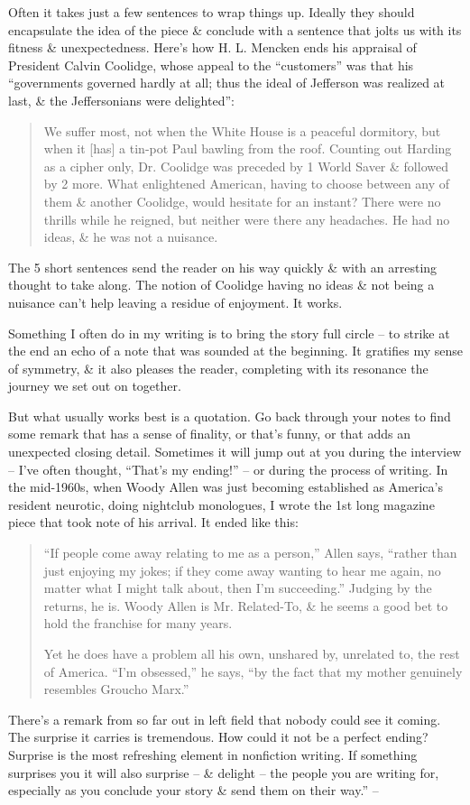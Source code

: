 \documentclass{article}
\begin{document}
Often it takes just a few sentences to wrap things up. Ideally they should encapsulate the idea of the piece \& conclude with a sentence that jolts us with its fitness \& unexpectedness. Here's how H. L. Mencken ends his appraisal of President Calvin Coolidge, whose appeal to the ``customers'' was that his ``governments governed hardly at all; thus the ideal of Jefferson was realized at last, \& the Jeffersonians were delighted'':
\begin{quotation}
	We suffer most, not when the White House is a peaceful dormitory, but when it [has] a tin-pot Paul bawling from the roof. Counting out Harding as a cipher only, Dr. Coolidge was preceded by 1 World Saver \& followed by 2 more. What enlightened American, having to choose between any of them \& another Coolidge, would hesitate for an instant? There were no thrills while he reigned, but neither were there any headaches. He had no ideas, \& he was not a nuisance.
\end{quotation}
The 5 short sentences send the reader on his way quickly \& with an arresting thought to take along. The notion of Coolidge having no ideas \& not being a nuisance can't help leaving a residue of enjoyment. It works.

Something I often do in my writing is to bring the story full circle -- to strike at the end an echo of a note that was sounded at the beginning. It gratifies my sense of symmetry, \& it also pleases the reader, completing with its resonance the journey we set out on together.

But what usually works best is a quotation. Go back through your notes to find some remark that has a sense of finality, or that's funny, or that adds an unexpected closing detail. Sometimes it will jump out at you during the interview -- I've often thought, ``That's my ending!'' -- or during the process of writing. In the mid-1960s, when Woody Allen was just becoming established as America's resident neurotic, doing nightclub monologues, I wrote the 1st long magazine piece that took note of his arrival. It ended like this:
\begin{quotation}
	``If people come away relating to me as a person,'' Allen says, ``rather than just enjoying my jokes; if they come away wanting to hear me again, no matter what I might talk about, then I'm succeeding.'' Judging by the returns, he is. Woody Allen is Mr. Related-To, \& he seems a good bet to hold the franchise for many years.
	
	Yet he does have a problem all his own, unshared by, unrelated to, the rest of America. ``I'm obsessed,'' he says, ``by the fact that my mother genuinely resembles Groucho Marx.''
\end{quotation}
There's a remark from so far out in left field that nobody could see it coming. The surprise it carries is tremendous. How could it not be a perfect ending? Surprise is the most refreshing element in nonfiction writing. If something surprises you it will also surprise -- \& delight -- the people you are writing for, especially as you conclude your story \& send them on their way.'' -- \cite[pp. 57--67]{Zinsser2016}
\end{document}
